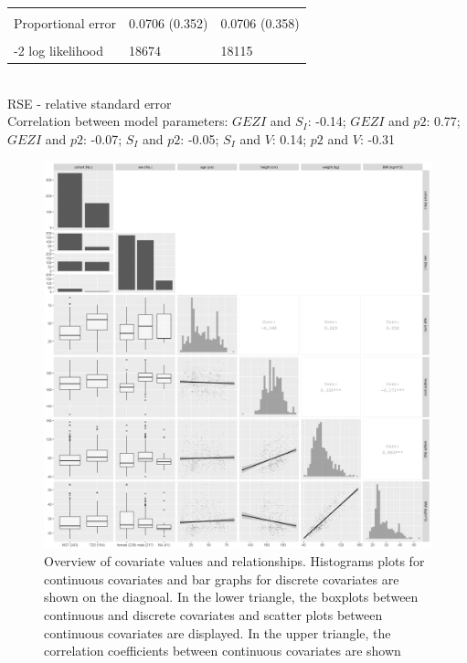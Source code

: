 \documentclass[utf8]{frontiersSCNS} %
\begin{document}
\begin{table}[h]
\begin{tabular}{lll}
                              &               &               \\
Proportional error  & 0.0706 (0.352)                            & 0.0706 (0.358) \\                        \\
-2 log likelihood             & 18674       & 18115       \\ \hline
\end{tabular}\\

RSE - relative standard error\\
Correlation between model parameters: $GEZI$ and $S_I$: -0.14; $GEZI$ and $p2$: 0.77; $GEZI$ and $p2$: -0.07; $S_I$ and $p2$: -0.05; $S_I$ and $V$: 0.14; $p2$ and $V$: -0.31
\end{table}

\begin{figure}[h!]
\begin{center}
\includegraphics[width=15cm]{p2.PNG}
\end{center}
\caption{Overview of covariate values and relationships. Histograms plots for continuous covariates and bar graphs for discrete covariates are shown on the diagnoal. In the lower triangle, the boxplots between continuous and discrete covariates and scatter plots between continuous covariates are displayed. In the upper triangle, the correlation coefficients between continuous covariates are shown}
\label{fig: cova}
\end{figure}
\end{document}
